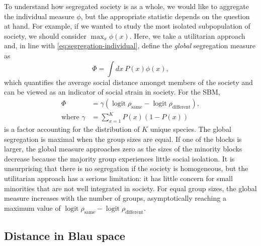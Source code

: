 \documentclass{scrartcl}
\DeclareMathOperator{\logit}{logit}
\newcommand{\titlecaption}[2]{\caption[#1]{\emph{#1} #2}}
\begin{document}

To understand how segregated society is as a whole, we would like to aggregate the individual measure $\phi$, but the appropriate statistic depends on the question at hand. For example, if we wanted to study the most isolated subpopulation of society, we should consider $\max_x\phi(x)$. Here, we take a utilitarian approach and, in line with \cref{eq:segregation-individual}, define the \emph{global} segregation measure as
\begin{equation}
    \Phi = \int dx\ P(x) \phi(x),\label{eq:segregation-global}
\end{equation}
which quantifies the average social distance amongst members of the society and can be viewed as an indicator of social strain in society. For the SBM,
\begin{align}
    \Phi&= \gamma\left(\logit\rho_\mathrm{same}-\logit\rho_\mathrm{different}\right),\nonumber \\
    \text{where }\gamma&=\sum_{x=1}^K P(x) \left(1 - P(x)\right)\label{eq:segregation-distributional-factor}
\end{align}
is a factor accounting for the distribution of $K$ unique species. The global segregation is maximal when the group sizes are equal. If one of the blocks is larger, the global measure approaches zero as the sizes of the minority blocks decrease because the majority group experiences little social isolation. It is unsurprising that there is no segregation if the society is homogeneous, but the utilitarian approach has a serious limitation: it has little concern for small minorities that are not well integrated in society. For equal group sizes, the global measure increases with the number of groups, asymptotically reaching a maximum value of $\logit\rho_\mathrm{same}-\logit\rho_\mathrm{different}$.

\subsection{Distance in Blau space\label{sec:segregation-distance}}
\end{document}
